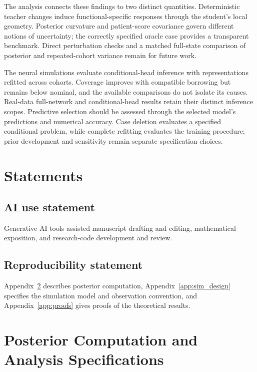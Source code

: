 \documentclass{article} %
\begin{document}
The analysis connects these findings to two distinct quantities. Deterministic teacher changes induce functional-specific responses through the student's local geometry. Posterior curvature and patient-score covariance govern different notions of uncertainty; the correctly specified oracle case provides a transparent benchmark. Direct perturbation checks and a matched full-state comparison of posterior and repeated-cohort variance remain for future work.

The neural simulations evaluate conditional-head inference with representations refitted across cohorts. Coverage improves with compatible borrowing but remains below nominal, and the available comparisons do not isolate its causes. Real-data full-network and conditional-head results retain their distinct inference scopes. Predictive selection should be assessed through the selected model's predictions and numerical accuracy. Case deletion evaluates a specified conditional problem, while complete refitting evaluates the training procedure; prior development and sensitivity remain separate specification choices.


\section{Statements}
\subsection*{AI use statement}
Generative AI tools assisted manuscript drafting and editing, mathematical exposition, and research-code development and review.

\subsection*{Reproducibility statement}
Appendix~\ref{app:mala} describes posterior computation, Appendix~\ref{app:sim_design} specifies the simulation model and observation convention, and Appendix~\ref{app:proofs} gives proofs of the theoretical results.


\clearpage
\appendix


\section{Posterior Computation and Analysis Specifications}
\label{app:mala}
\end{document}
